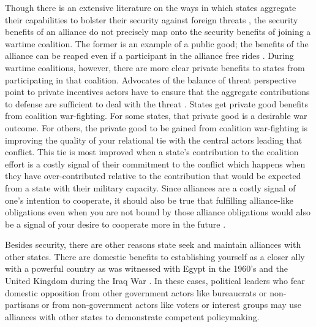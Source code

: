 \documentclass[12pt,letterpaper]{article}
\begin{document}
		Though there is an extensive literature on the ways in which states aggregate their capabilities to bolster their security against foreign threats \citep{waltz_theoryinternationalpolitics_1979}, the security benefits of an alliance do not precisely map onto the security benefits of joining a wartime coalition. The former is an example of a public good; the benefits of the alliance can be reaped even if a participant in the alliance free rides \citep{olson_economictheoryalliances_1966}. During wartime coalitions, however, there are more clear private benefits to states from participating in that coalition. Advocates of the balance of threat perspective point to private incentives actors have to ensure that the aggregate contributions to defense are sufficient to deal with the threat \citep{bennett_friendsneedburden_1997, baltrusaitis_coalitionpoliticsiraq_2010, davidson_neoclassicalrealistexplanation_2011}. 		States get private good benefits from coalition war-fighting. For some states, that private good is a desirable war outcome.  For others, the private good to be gained from coalition war-fighting is improving the quality of your relational tie with the central actors leading that conflict. This tie is most improved when a state's contribution to the coalition effort is a costly signal of their commitment to the conflict which happens when they have over-contributed relative to the contribution that would be expected from a state with their military capacity. Since alliances are a costly signal of one's intention to cooperate, it should also be true that fulfilling alliance-like obligations even when you are not bound by those alliance obligations would also be a signal of your desire to cooperate more in the future \citep{warren_geometrysecuritymodeling_2010}.

		Besides security, there are other reasons state seek and maintain alliances with other states. There are domestic benefits to establishing yourself as a closer ally with a powerful country as was witnessed with Egypt in the 1960's \citep{barnett_domesticsourcesalliances_1991} and the United Kingdom during the Iraq War \citep{davidson_americaallieswar_2011}. In these cases, political leaders who fear domestic opposition from other government actors like bureaucrats or non-partisans or from non-government actors like voters or interest groups may use alliances with other states to demonstrate competent policymaking.
\end{document}
